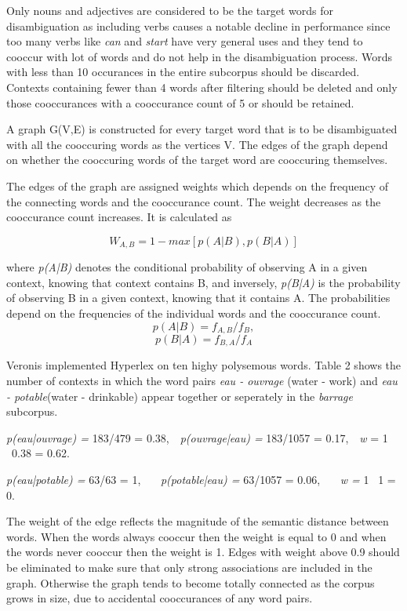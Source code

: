 \documentclass[article,dr=phil,type=drfinal,colorback,accentcolor=tud9c]{tudthesis}
\begin{document}
Only nouns and adjectives are considered to be the target words for disambiguation as including verbs causes a notable decline in performance since too many verbs like \textit{can} and \textit{start} have very general uses and they tend to cooccur with lot of words and do not help in the disambiguation process. Words with less than 10 occurances in the entire subcorpus should be discarded. Contexts containing fewer than 4 words after filtering should be deleted and only those cooccurances with a cooccurance count of 5 or should be retained.

A graph G(V,E) is constructed for every target word that is to be disambiguated with all the cooccuring words as the vertices V. The edges of the graph depend on whether the cooccuring words of the target word are cooccuring themselves. 

The edges of the graph are assigned weights which depends on the frequency of the connecting words and the cooccurance count. The weight decreases as the cooccurance count increases. It is calculated as

\textit{\[W_{A,B} =  1 - max[p(A|B),p(B|A)]\]}

where \textit{p(A|B)} denotes the conditional probability of observing A in a given context, knowing that context contains B, and inversely, \textit{p(B|A)} is the probability of observing B in a given context, knowing that it contains A. The probabilities depend on the frequencies of the individual words and the cooccurance count.
\textit{\[p(A|B) = f_{A,B}/f_B,\]}
\textit{\[p(B|A) = f_{B,A}/f_A\]}

Veronis implemented Hyperlex on ten highy polysemous words. Table 2 shows the number of contexts in which the word pairs \textit{eau - ouvrage} (water - work) and \textit{eau - potable}(water - drinkable) appear together or seperately in the \textit{barrage} subcorpus.\newline

\textit{p(eau|ouvrage) =} 183/479 = 0.38,\ \  \textit{p(ouvrage|eau) = } 183/1057 = 0.17,\ \    \textit{w} = 1 \textminus\  0.38 = 0.62.
\newline


\textit{p(eau|potable) = }63/63 = 1, \ \ \ \textit{p(potable|eau) = }63/1057 = 0.06, \ \ \  \textit{w = }1 \textminus\ 1 = 0.

The weight of the edge reflects the magnitude of the semantic distance between words. When the words always cooccur then the weight is equal to 0 and when the words never cooccur then the weight is 1. Edges with weight above 0.9 should be eliminated to make sure that only strong associations are included in the graph. Otherwise the graph tends to become totally connected as the corpus grows in size, due to accidental cooccurances of any word pairs.
\end{document}

